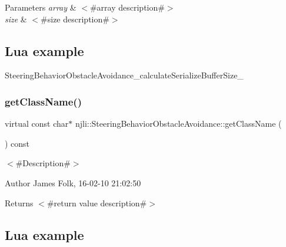 \begin{DoxyParams}{Parameters}
{\em array} & $<$\#array description\#$>$ \\
\hline
{\em size} & $<$\#size description\#$>$\\
\hline
\end{DoxyParams}
\hypertarget{classnjli_1_1_steering_behavior_wander_ex1}{}\subsection{Lua example}\label{classnjli_1_1_steering_behavior_wander_ex1}

\begin{DoxyCodeInclude}
\end{DoxyCodeInclude}
Steering\+Behavior\+Obstacle\+Avoidance\+\_\+calculate\+Serialize\+Buffer\+Size\+\_\+ \mbox{\label{classnjli_1_1_steering_behavior_obstacle_avoidance_a4d8d5d43a2561ac4ea95e8c7a8e67630}} 
\subsubsection{\texorpdfstring{get\+Class\+Name()}{getClassName()}}
{\footnotesize\ttfamily virtual const char$\ast$ njli\+::\+Steering\+Behavior\+Obstacle\+Avoidance\+::get\+Class\+Name (\begin{DoxyParamCaption}{ }\end{DoxyParamCaption}) const\hspace{0.3cm}{\ttfamily [virtual]}}



$<$\#\+Description\#$>$ 

\begin{DoxyAuthor}{Author}
James Folk, 16-\/02-\/10 21\+:02\+:50
\end{DoxyAuthor}
\begin{DoxyReturn}{Returns}
$<$\#return value description\#$>$
\end{DoxyReturn}
\hypertarget{classnjli_1_1_steering_behavior_wander_ex1}{}\subsection{Lua example}\label{classnjli_1_1_steering_behavior_wander_ex1}

